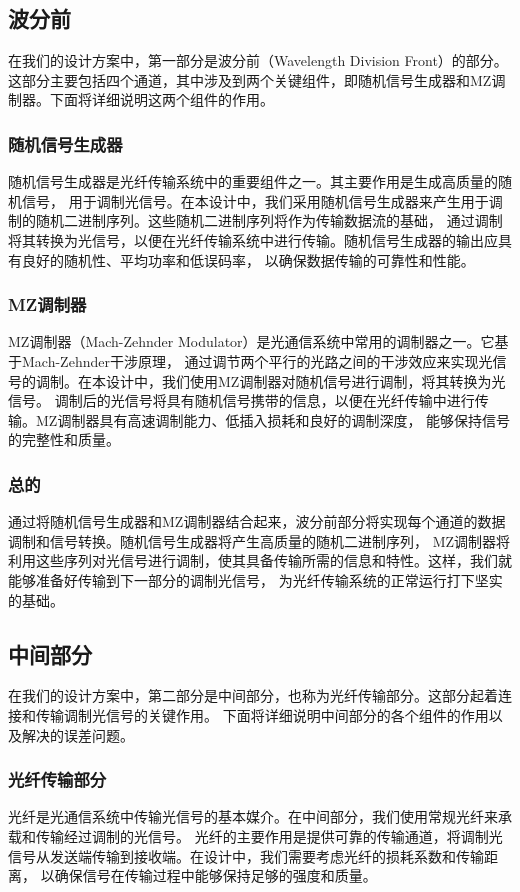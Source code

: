 \documentclass[12pt]{article}
\begin{document}
\subsection{波分前}
在我们的设计方案中，第一部分是波分前（Wavelength Division Front）的部分。
这部分主要包括四个通道，其中涉及到两个关键组件，即随机信号生成器和MZ调制器。下面将详细说明这两个组件的作用。
\subsubsection*{随机信号生成器}
随机信号生成器是光纤传输系统中的重要组件之一。其主要作用是生成高质量的随机信号，
用于调制光信号。在本设计中，我们采用随机信号生成器来产生用于调制的随机二进制序列。这些随机二进制序列将作为传输数据流的基础，
通过调制将其转换为光信号，以便在光纤传输系统中进行传输。随机信号生成器的输出应具有良好的随机性、平均功率和低误码率，
以确保数据传输的可靠性和性能。
\subsubsection*{MZ调制器}
MZ调制器（Mach-Zehnder Modulator）是光通信系统中常用的调制器之一。它基于Mach-Zehnder干涉原理，
通过调节两个平行的光路之间的干涉效应来实现光信号的调制。在本设计中，我们使用MZ调制器对随机信号进行调制，将其转换为光信号。
调制后的光信号将具有随机信号携带的信息，以便在光纤传输中进行传输。MZ调制器具有高速调制能力、低插入损耗和良好的调制深度，
能够保持信号的完整性和质量。
\subsubsection*{总的}
通过将随机信号生成器和MZ调制器结合起来，波分前部分将实现每个通道的数据调制和信号转换。随机信号生成器将产生高质量的随机二进制序列，
MZ调制器将利用这些序列对光信号进行调制，使其具备传输所需的信息和特性。这样，我们就能够准备好传输到下一部分的调制光信号，
为光纤传输系统的正常运行打下坚实的基础。

\subsection{中间部分}
在我们的设计方案中，第二部分是中间部分，也称为光纤传输部分。这部分起着连接和传输调制光信号的关键作用。
下面将详细说明中间部分的各个组件的作用以及解决的误差问题。
\subsubsection*{光纤传输部分}
光纤是光通信系统中传输光信号的基本媒介。在中间部分，我们使用常规光纤来承载和传输经过调制的光信号。
光纤的主要作用是提供可靠的传输通道，将调制光信号从发送端传输到接收端。在设计中，我们需要考虑光纤的损耗系数和传输距离，
以确保信号在传输过程中能够保持足够的强度和质量。
\end{document}
